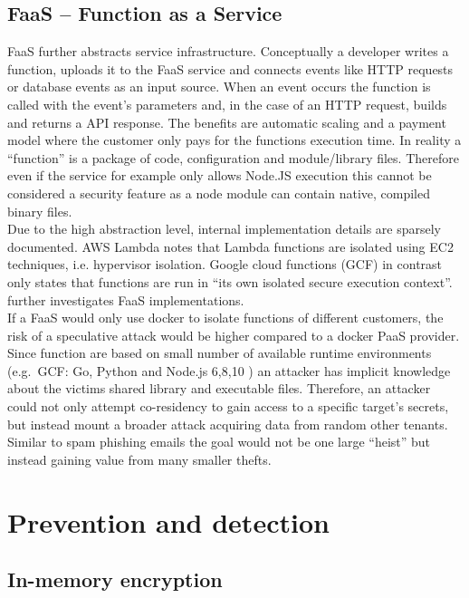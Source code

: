\documentclass[conference,compsoc,final,a4paper]{IEEEtran}
\begin{document}
\subsection{FaaS -- Function as a Service}
FaaS further abstracts service infrastructure. Conceptually a developer writes a function, uploads it to the FaaS service and connects events like HTTP requests or
database events as an input source. When an event occurs the function is called with the event's parameters and, in the case of an HTTP request, builds and
returns a API response. The benefits are automatic scaling and a payment model where the customer only pays for the functions execution time. In reality a
\enquote{function} is a package of code, configuration and module/library files. Therefore even if the service for example only allows Node.JS execution this cannot
be considered a security feature as a node module can contain native, compiled binary files\cite{lambdaFaq}. \\
Due to the high abstraction level, internal implementation details are sparsely documented. AWS Lambda notes that Lambda functions are isolated using EC2 techniques, i.e.
hypervisor isolation\cite{lambdaFaq}. Google cloud functions (GCF) in contrast only states that functions are run in
\enquote{its own isolated secure execution context}\cite{cloudFunc}. \textcite{wang2018peeking} further investigates FaaS implementations. \\
If a FaaS would only use docker to isolate functions of different customers, the risk of a speculative attack would be higher compared to a docker PaaS provider. Since
function are based on small number of available runtime environments (e.g.\ GCF: Go, Python and Node.js 6,8,10 \cite{cloudFunc}) an attacker has implicit knowledge
about the victims shared library and executable files. Therefore, an attacker could not only attempt co-residency to gain access to a specific target's secrets, but instead
mount a broader attack acquiring data from random other tenants. Similar to spam phishing emails the goal would not be one large \enquote{heist} but instead gaining
value from many smaller thefts.
\section{Prevention and detection}
\subsection{In-memory encryption}
\end{document}
